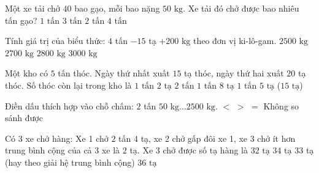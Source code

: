 \begin{ex} %
Một xe tải chở $40$ bao gạo, mỗi bao nặng $50\text{ kg}$. Xe tải đó chở được bao nhiêu tấn gạo?
\choice
{$1\text{ tấn}$}
{$3\text{ tấn}$}
{\True $2\text{ tấn}$}
{$4\text{ tấn}$}
\end{ex}

\begin{ex} %
Tính giá trị của biểu thức: $4$ tấn $- 15$ tạ $+ 200\text{ kg}$ theo đơn vị ki-lô-gam.
\choice
{$2500\text{ kg}$}
{\True $2700\text{ kg}$}
{$2800\text{ kg}$}
{$3000\text{ kg}$}
\end{ex}

\begin{ex} %
Một kho có $5$ tấn thóc. Ngày thứ nhất xuất $15$ tạ thóc, ngày thứ hai xuất $20$ tạ thóc. Số thóc còn lại trong kho là
\choice
{$1\text{ tấn } 2\text{ tạ}$}
{$2\text{ tấn}$}
{$1\text{ tấn } 8\text{ tạ}$}
{\True $1\text{ tấn } 5\text{ tạ}$ ($15\text{ tạ}$)}
\end{ex}

\begin{ex} %
Điền dấu thích hợp vào chỗ chấm: $2$ tấn $50\text{ kg} \dots 2500\text{ kg}$.
\choice
{\True $<$}
{$>$}
{$=$}
{Không so sánh được}
\end{ex}

\begin{ex} %
Có 3 xe chở hàng: Xe 1 chở $2$ tấn $4$ tạ, xe 2 chở gấp đôi xe 1, xe 3 chở ít hơn trung bình cộng của cả 3 xe là $2$ tạ. Xe 3 chở được số tạ hàng là
\choice
{$32\text{ tạ}$}
{$34\text{ tạ}$}
{\True $33$ tạ (hay theo giải hệ trung bình cộng)}
{$36\text{ tạ}$}
\end{ex}

